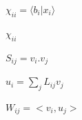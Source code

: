 \documentclass{article}
\begin{document}
$\chi_{ii}=\langle b_i|x_i\rangle$
\pagebreak

$\chi_{ii}$
\pagebreak

$ S_{ij}= v_i . v_j $
\pagebreak

$ u_i = \sum_j L_{ij} v_j $
\pagebreak

$ W_{ij} = <v_i, u_j> $
\pagebreak
\end{document}
